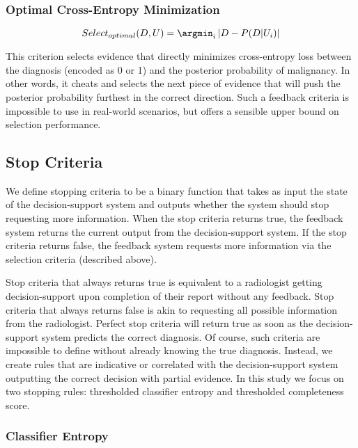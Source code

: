\subsubsection{Optimal Cross-Entropy Minimization}

\begin{equation}
Select_{optimal}(D, U) = \argmin_{i} \left|D-P(D | U_i)\right|
\end{equation}

This criterion selects evidence that directly minimizes cross-entropy loss between the diagnosis (encoded as 0 or 1) and the posterior probability of malignancy. In other words, it cheats and selects the next piece of evidence that will push the posterior probability furthest in the correct direction. Such a feedback criteria is impossible to use in real-world scenarios, but offers a sensible upper bound on selection performance.

\subsection{Stop Criteria}
We define stopping criteria to be a binary function that takes as input the state of the decision-support system and outputs whether the system should stop requesting more information. When the stop criteria returns true, the feedback system returns the current output from the decision-support system. If the stop criteria returns false, the feedback system requests more information via the selection criteria (described above). 

Stop criteria that always returns true is equivalent to a radiologist getting decision-support upon completion of their report without any feedback. Stop criteria that always returns false is akin to requesting all possible information from the radiologist. Perfect stop criteria will return true as soon as the decision-support system predicts the correct diagnosis. Of course, such criteria are impossible to define without already knowing the true diagnosis. Instead, we create rules that are indicative or correlated with the decision-support system outputting the correct decision with partial evidence. In this study we focus on two stopping rules: thresholded classifier entropy and thresholded completeness score.

\subsubsection{Classifier Entropy}

